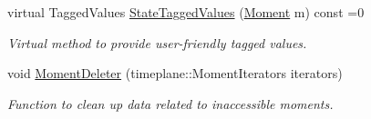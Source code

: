 \begin{DoxyCompactItemize}
virtual Tagged\+Values \hyperlink{classitem_1_1_item_a8410ab3ab75e65360eddb4f6bd3cceff}{State\+Tagged\+Values} (\hyperlink{classtimeplane_1_1_moment}{Moment} m) const =0
\begin{DoxyCompactList}\small\item\em Virtual method to provide user-\/friendly tagged values. \end{DoxyCompactList}\item 
void \hyperlink{classitem_1_1_item_a8d78594540bff88538723a8a1fb881d5}{Moment\+Deleter} (timeplane\+::\+Moment\+Iterators iterators)
\begin{DoxyCompactList}\small\item\em Function to clean up data related to inaccessible moments. \end{DoxyCompactList}\end{DoxyCompactItemize}
